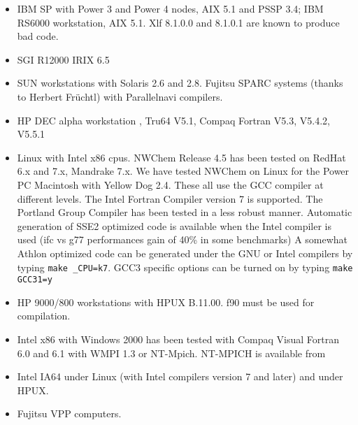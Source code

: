 \begin{itemize}
\item IBM SP with Power 3 and Power 4 nodes, AIX 5.1
    and PSSP 3.4; IBM RS6000 workstation, AIX 5.1. Xlf 8.1.0.0 and
    8.1.0.1 are known to produce bad code.
\item SGI R12000 IRIX 6.5 
\item SUN workstations with Solaris 2.6 and 2.8. Fujitsu SPARC systems 
   (thanks to Herbert Fr\"uchtl) with Parallelnavi compilers.
\item HP DEC alpha workstation , Tru64 V5.1,
    Compaq Fortran V5.3, V5.4.2, V5.5.1
\item Linux with Intel x86 cpus. 
    NWChem Release 4.5 has been tested on RedHat 6.x and 7.x,
    Mandrake  7.x.
    We have tested NWChem on Linux for the Power PC Macintosh with
    Yellow Dog 2.4.
    These all use the GCC compiler at different levels. 
    The Intel Fortran Compiler version 7 is supported.
    The Portland Group Compiler has been tested in a less robust manner.
    Automatic generation of SSE2 optimized code is available when the 
    Intel compiler is used (ifc vs g77 performances gain of 40\% in
    some benchmarks)
    A somewhat Athlon optimized code can be generated under the GNU
    or Intel compilers by typing {\tt make \_CPU=k7}.
    GCC3 specific options can be turned on by typing {\tt make GCC31=y}
\item HP 9000/800 workstations with  HPUX B.11.00. f90 must be used for
    compilation.
\item Intel x86 with Windows 2000 has been tested with Compaq Visual Fortran
    6.0 and 6.1 with WMPI 1.3 or NT-Mpich.
    NT-MPICH is available from

\item Intel IA64 under Linux (with Intel compilers version 7 and later)
    and under HPUX.
\item Fujitsu VPP computers.


\end{itemize}

